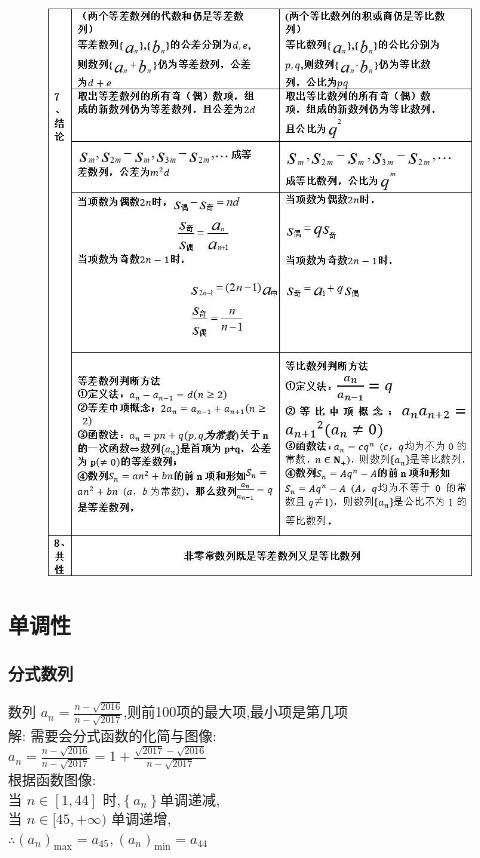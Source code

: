 \documentclass[hyperref, UTF8,11pt,a4paper]{ctexart} %
\begin{document}
\begin{figure}[!h] %
	\centering
	\includegraphics[width=450pt]  {pic/shulie/shuliexingzhi2.jpg} \\
\end{figure}

\clearpage
\subsection{单调性}
\subsubsection{分式数列}
{\color{red} 数列 $a_{n}=\frac{n-\sqrt{2016}}{n-\sqrt{2017}}$,则前100项的最大项,最小项是第几项 }\\
解: {\color{blue}  需要会分式函数的化简与图像: } \\
$a_{n}=\frac{n-\sqrt{2016}}{n-\sqrt{2017}}=1+\frac{\sqrt{2017}-\sqrt{2016}}{n-\sqrt{2017}}$ \\
根据函数图像: \\
当 $n \in[1,44]$ 时,$\left\{a_{n}\right\}$单调递减, \\
当 $n \in[45,+\infty)$ 单调递增, \\
$\therefore \left(a_{n}\right)_{\max }=a_{45},\left(a_{n}\right)_{\min }=a_{44}$
\end{document}
